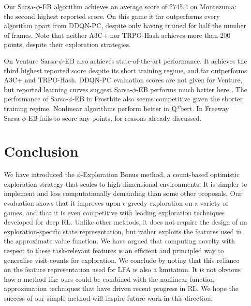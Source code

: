 \documentclass{article}
\theoremstyle{definition}
\theoremstyle{definition}
\theoremstyle{plain}
\theoremstyle{plain}
\theoremstyle{plain}
\begin{document}
Our Sarsa-$\phi$-EB algorithm achieves an average score of 2745.4
on Montezuma: the second highest reported score. On this game it far
outperforms every algorithm apart from DDQN-PC, despite only having
trained for half the number of frames. Note that neither A3C+ nor
TRPO-Hash achieves more than 200 points, despite their exploration
strategies. 

On Venture Sarsa-$\phi$-EB also achieves state-of-the-art performance.
It achieves the third highest reported score despite its short training
regime, and far outperforms A3C+ and TRPO-Hash. DDQN-PC evaluation
scores are not given for Venture, but reported learning curves suggest
Sarsa-$\phi$-EB performs much better here \cite{Bellemare2016}.
The performance of Sarsa-$\phi$-EB in Frostbite also seems competitive
given the shorter training regime. Nonlinear algorithms perform better
in Q{*}bert. In Freeway Sarsa-$\phi$-EB fails to score any points,
for reasons already discussed.


\section{Conclusion}

We have introduced the $\phi$-Exploration Bonus method, a count-based
optimistic exploration strategy that scales to high-dimensional environments.
It is simpler to implement and less computationally demanding than
some other proposals. Our evaluation shows that it improves upon $\epsilon$-greedy
exploration on a variety of games, and that it is even competitive
with leading exploration techniques developed for deep RL. Unlike
other methods, it does not require the design of an exploration-specific
state representation, but rather exploits the features used in the
approximate value function. We have argued that computing novelty
with respect to these task-relevant features is an efficient and principled
way to generalise visit-counts for exploration. We conclude by noting
that this reliance on the feature representation used for LFA is also
a limitation. It is not obvious how a method like ours could be combined
with the nonlinear function approximation techniques that have driven
recent progress in RL. We hope the success of our simple method will
inspire future work in this direction.



\end{document}
